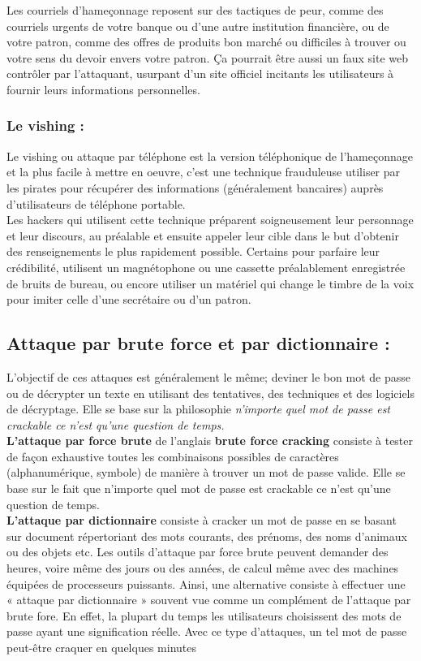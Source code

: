 Les courriels d'hameçonnage reposent sur des tactiques de peur, comme des courriels urgents de votre banque ou d'une autre institution financière, ou de votre patron, comme des offres de produits bon marché ou difficiles à trouver ou votre sens du devoir envers votre patron. Ça pourrait être aussi un faux site web contrôler par l’attaquant, usurpant d’un site officiel incitants les utilisateurs à fournir leurs informations personnelles.
\subsubsection{Le vishing : }
Le vishing ou attaque par téléphone est la version téléphonique de l’hameçonnage et la plus facile à mettre en oeuvre, c’est une technique frauduleuse utiliser par les pirates pour récupérer des informations (généralement bancaires) auprès d’utilisateurs de téléphone portable.\\

Les hackers qui utilisent cette technique préparent soigneusement leur personnage et leur discours, au préalable et ensuite appeler leur cible dans le but d’obtenir des renseignements le plus rapidement possible. Certains pour parfaire leur crédibilité, utilisent un magnétophone ou une cassette préalablement enregistrée de bruits de bureau, ou encore utiliser un matériel qui change le timbre de la voix pour imiter celle d'une secrétaire ou d’un patron.

\subsection{Attaque par brute force et par dictionnaire : }
L’objectif de ces attaques est généralement le même; deviner le bon mot de passe ou de décrypter un texte en utilisant des tentatives, des techniques et des logiciels de décryptage. Elle se base sur la philosophie \textit{n’importe quel mot de passe est crackable ce n’est qu’une question de temps.}\\

\textbf{L’attaque par force brute} de l’anglais \textbf{brute force cracking} consiste à tester de façon exhaustive toutes les combinaisons possibles de caractères (alphanumérique, symbole) de manière à trouver un mot de passe valide. Elle se base sur le fait que n’importe quel mot de passe est crackable ce n’est qu’une question de temps.\\
\textbf{L’attaque par dictionnaire} consiste à cracker un mot de passe en se basant sur document répertoriant des mots courants, des prénoms, des noms d’animaux ou des objets etc.
Les outils d'attaque par force brute peuvent demander des heures, voire même des jours ou des années, de calcul même avec des machines équipées de processeurs puissants. Ainsi, une alternative consiste à effectuer une « attaque par dictionnaire » souvent vue comme un complément de l’attaque par brute fore. En effet, la plupart du temps les utilisateurs choisissent des mots de passe ayant une signification réelle. Avec ce type d'attaques, un tel mot de passe peut-être craquer en quelques minutes
